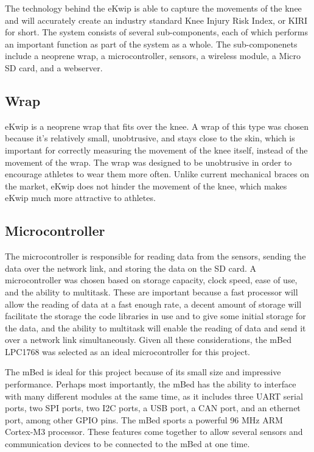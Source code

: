The technology behind the eKwip is able to capture the movements of the knee and will accurately create an industry standard Knee Injury Risk Index, or KIRI for short. The system consists of several sub-components, each of which performs an important function as part of the system as a whole. The sub-componenets include a neoprene wrap, a microcontroller, sensors, a wireless module, a Micro SD card, and a webserver.

\subsection {Wrap}
eKwip is a neoprene wrap that fits over the knee. A wrap of this type was chosen because it’s relatively small, unobtrusive, and stays close to the skin, which is important for correctly measuring the movement of the knee itself, instead of the movement of the wrap. The wrap was designed to be unobtrusive in order to encourage athletes to wear them more often. Unlike current mechanical braces on the market, eKwip does not hinder the movement of the knee, which makes eKwip much more attractive to athletes.

\subsection {Microcontroller}
The microcontroller is responsible for reading data from the sensors, sending the data over the network link, and storing the data on the SD card. A microcontroller was chosen based on storage capacity, clock speed, ease of use, and the ability to multitask. These are important because a fast processor will allow the reading of data at a fast enough rate, a decent amount of storage will facilitate the storage the code libraries in use and to give some initial storage for the data, and the ability to multitask will enable the reading of data and send it over a network link simultaneously. Given all these considerations, the mBed LPC1768 was selected as an ideal microcontroller for this project.

The mBed is ideal for this project because of its small size and impressive performance. Perhaps most importantly, the mBed has the ability to interface with many different modules at the same time, as it includes three UART serial ports, two SPI ports, two I2C ports, a USB port, a CAN port, and an ethernet port, among other GPIO pins. The mBed sports a powerful 96 MHz ARM Cortex-M3 processor. These features come together to allow several sensors and communication devices to be connected to the mBed at one time.

